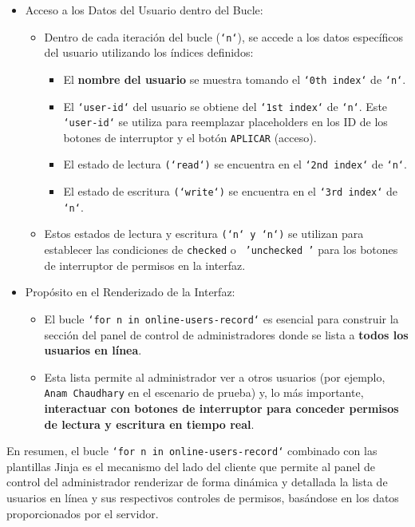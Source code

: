 \documentclass{report}
\begin{document}
\begin{itemize}
    \item Acceso a los Datos del Usuario dentro del Bucle:
    \begin{itemize}
        \item Dentro de cada iteración del bucle (\texttt{`n`}), se accede a los datos específicos del usuario utilizando los índices definidos:
        \begin{itemize}
            \item El \textbf{nombre del usuario} se muestra tomando el \texttt{`0th index`} de \texttt{`n`}.
            \item El \texttt{`user-id`} del usuario se obtiene del \texttt{`1st index`} de \texttt{`n`}. Este \texttt{`user-id`} se utiliza para 
            reemplazar placeholders en los ID de los botones de interruptor y el botón \texttt{APLICAR} (acceso).
            \item El estado de lectura \texttt{(`read`)} se encuentra en el \texttt{`2nd index`} de \texttt{`n`}.
            \item El estado de escritura \texttt{(`write`)} se encuentra en el \texttt{`3rd index`} de \texttt{`n`}.
        \end{itemize}
        \item Estos estados de lectura y escritura \texttt{(`n` y `n`)} se utilizan para establecer las condiciones de \texttt{checked} o 
        \texttt{ 'unchecked '} para los botones de interruptor de permisos en la interfaz.    
    \end{itemize}

    \item Propósito en el Renderizado de la Interfaz:
    \begin{itemize}
        \item El bucle \texttt{`for n in online-users-record`} es esencial para construir la sección del panel de control de administradores donde se lista 
        a \textbf{todos los usuarios en línea}.
        \item Esta lista permite al administrador ver a otros usuarios (por ejemplo, \texttt{Anam Chaudhary} en el escenario de prueba) y, lo más 
        importante, \textbf{interactuar con botones de interruptor para conceder permisos de lectura y escritura en tiempo real}.    
    \end{itemize}
\end{itemize}

En resumen, el bucle \texttt{`for n in online-users-record`} combinado con las plantillas Jinja es el mecanismo del lado del cliente que permite 
al panel de control del administrador renderizar de forma dinámica y detallada la lista de usuarios en línea y sus respectivos controles de permisos, 
basándose en los datos proporcionados por el servidor.
\end{document}

